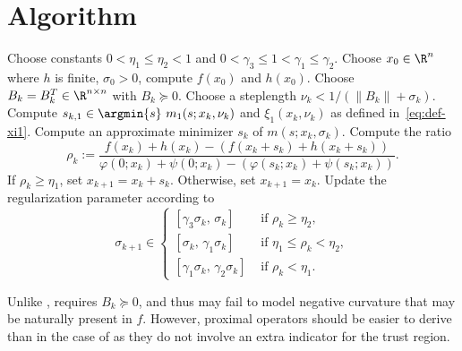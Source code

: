\documentclass[smallextended]{svjour3}       %
\begin{document}
\section{Algorithm}%
\label{sec:algorithm}

\begin{algorithm}[ht]
  \caption[caption]{%
    Nonsmooth regularized modified Newton method.%
    \label{alg:RN2}
  }
  \begin{algorithmic}[1]
    \State Choose constants \(0 < \eta_1 \leq \eta_2 < 1\) and \(0 < \gamma_3 \leq 1 < \gamma_1 \leq \gamma_2\).
    \State Choose \(x_0 \in \R^n\) where \(h\) is finite, \(\sigma_0 > 0\), compute \(f(x_0)\) and \(h(x_0)\).
      \State\label{alg:RN2:Bk}%
      Choose \(B_k = B_k^T \in \R^{n \times n}\) with \(B_k \succeq 0\).
      \State\label{alg:RN2:step-nuk}%
      Choose a steplength \(\nu_k < 1 / (\|B_k\| + \sigma_k)\).
      \State Compute \(s_{k,1} \in \argmin{s} \ m_1(s; x_k, \nu_k)\) and \(\xi_1(x_k, \nu_k)\) as defined in~\eqref{eq:def-xi1}.
      \State\label{alg:RN2:step-computation}%
      Compute an approximate minimizer \(s_k\) of \(m(s; x_k, \sigma_k)\).
      \State\label{alg:RN2:step-rhok}%
      Compute the ratio
      \[
      \rho_k :=
      \frac{
        f(x_k) + h(x_k) - (f(x_k + s_k) + h(x_k + s_k))
      }{
        \varphi(0; x_k) + \psi(0; x_k) - (\varphi(s_k; x_k) + \psi(s_k; x_k))
      }.
      \]
      \State\label{alg:RN2:step-accept}%
      If \(\rho_k \geq \eta_1\), set \(x_{k+1} = x_k + s_k\). Otherwise, set \(x_{k+1} = x_k\).
      \State\label{alg:RN2:step-update}%
      Update the regularization parameter according to
      \[
        \sigma_{k+1} \in
        \begin{cases}
          [\gamma_3 \sigma_k, \, \sigma_k] & \text{ if } \rho_k \geq \eta_2,
          \\ [\sigma_k, \, \gamma_1 \sigma_k] & \text{ if } \eta_1 \leq \rho_k < \eta_2,
          \\ [\gamma_1 \sigma_k, \, \gamma_2 \sigma_k] & \text{ if } \rho_k < \eta_1.
        \end{cases}
      \]
    \EndFor
  \end{algorithmic}
\end{algorithm}

Unlike \citep[Algorithm~\(3.1\)]{aravkin-baraldi-orban-2022},  requires \(B_k \succeq 0\), and thus may fail to model negative curvature that may be naturally present in \(f\).
However, proximal operators should be easier to derive than in the case of \citep[Algorithm~\(3.1\)]{aravkin-baraldi-orban-2022} as they do not involve an extra indicator for the trust region.
\end{document}
